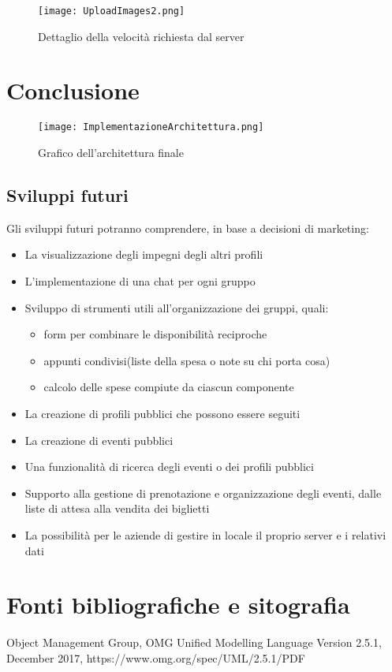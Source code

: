\begin{figure}[htbp]
    \begin{center}
        \texttt{[image: UploadImages2.png]}
        \caption{Dettaglio della velocità richiesta dal server}
    \end{center}
\end{figure}


\clearpage
\section{Conclusione}
\begin{figure}[htbp]
    \begin{center}
        \texttt{[image: ImplementazioneArchitettura.png]}
        \caption{Grafico dell'architettura finale}
    \end{center}
\end{figure}
\clearpage

\subsection{Sviluppi futuri}
Gli sviluppi futuri potranno comprendere, in base a decisioni di marketing:
\begin{itemize}
    \item La visualizzazione degli impegni degli altri profili
    \item L'implementazione di una chat per ogni gruppo
    \item Sviluppo di strumenti utili all'organizzazione dei gruppi, quali:
          \begin{itemize}
              \item form per combinare le disponibilità reciproche
              \item appunti condivisi(liste della spesa o note su chi porta cosa)
              \item calcolo delle spese compiute da ciascun componente
          \end{itemize}
    \item La creazione di profili pubblici che possono essere seguiti
    \item La creazione di eventi pubblici
    \item Una funzionalità di ricerca degli eventi o dei profili pubblici
    \item Supporto alla gestione di prenotazione e organizzazione degli eventi, dalle liste di attesa alla vendita dei biglietti
    \item La possibilità per le aziende di gestire in locale il proprio server e i relativi dati
\end{itemize}
\clearpage
\section{Fonti bibliografiche e sitografia}


Object Management Group, OMG Unified Modelling Language Version 2.5.1, December 2017, https://www.omg.org/spec/UML/2.5.1/PDF

